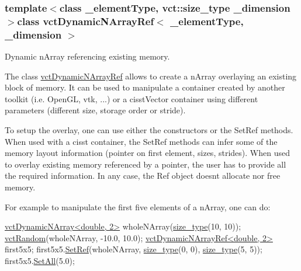 \subsubsection*{template$<$class \+\_\+element\+Type, vct\+::size\+\_\+type \+\_\+dimension$>$class vct\+Dynamic\+N\+Array\+Ref$<$ \+\_\+element\+Type, \+\_\+dimension $>$}

Dynamic n\+Array referencing existing memory. 

The class \hyperlink{classvct_dynamic_n_array_ref}{vct\+Dynamic\+N\+Array\+Ref} allows to create a n\+Array overlaying an existing block of memory. It can be used to manipulate a container created by another toolkit (i.\+e. Open\+G\+L, vtk, ...) or a cisst\+Vector container using different parameters (different size, storage order or stride).

To setup the overlay, one can use either the constructors or the Set\+Ref methods. When used with a cisst container, the Set\+Ref methods can infer some of the memory layout information (pointer on first element, sizes, strides). When used to overlay existing memory referenced by a pointer, the user has to provide all the required information. In any case, the Ref object doesn\textquotesingle{}t allocate nor free memory.

For example to manipulate the first five elements of a n\+Array, one can do\+: 
\begin{DoxyCode}
\hyperlink{classvct_dynamic_n_array}{vctDynamicNArray<double, 2>} wholeNArray(\hyperlink{namespacevct_a3e2935e13aac4500965e00d30565775b}{size\_type}(10, 10));
\hyperlink{group__cisst_vector_ga0d25660a2dc6ef9c093f6f6b2804d2d0}{vctRandom}(wholeNArray, -10.0, 10.0);
\hyperlink{classvct_dynamic_n_array_ref}{vctDynamicNArrayRef<double, 2>} first5x5;
first5x5.\hyperlink{classvct_dynamic_n_array_ref_a395385ec68aafaea6e60af8bd330eb82}{SetRef}(wholeNArray, \hyperlink{namespacevct_a3e2935e13aac4500965e00d30565775b}{size\_type}(0, 0), \hyperlink{namespacevct_a3e2935e13aac4500965e00d30565775b}{size\_type}(5, 5));
first5x5.\hyperlink{classvct_dynamic_n_array_base_a4f0285807b627852ebd8ab0ac3ef3fec}{SetAll}(5.0);
\end{DoxyCode}


